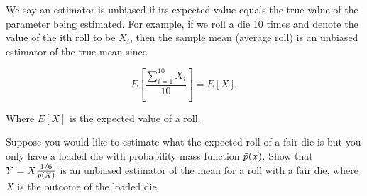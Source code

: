 We say an estimator is unbiased if its expected value equals the true value of the parameter being estimated. For example, if we roll a die 10 times and denote the value of the ith roll to be $X_i$, then the sample mean (average roll) is an unbiased estimator of the true mean since

\[
    E\left[\frac{\sum_{i=1}^{10}{X_i}}{10}\right] = E[X].
\]

Where $E[X]$ is the expected value of a roll.

Suppose you would like to estimate what the expected roll of a fair die is but you only have a loaded die with probability mass function $\Tilde{p}(x)$. Show that $Y = X \frac{1/6}{\Tilde{p}(X)}$ is an unbiased estimator of the mean for a roll with a fair die, where $X$ is the outcome of the loaded die.

\smallspace


